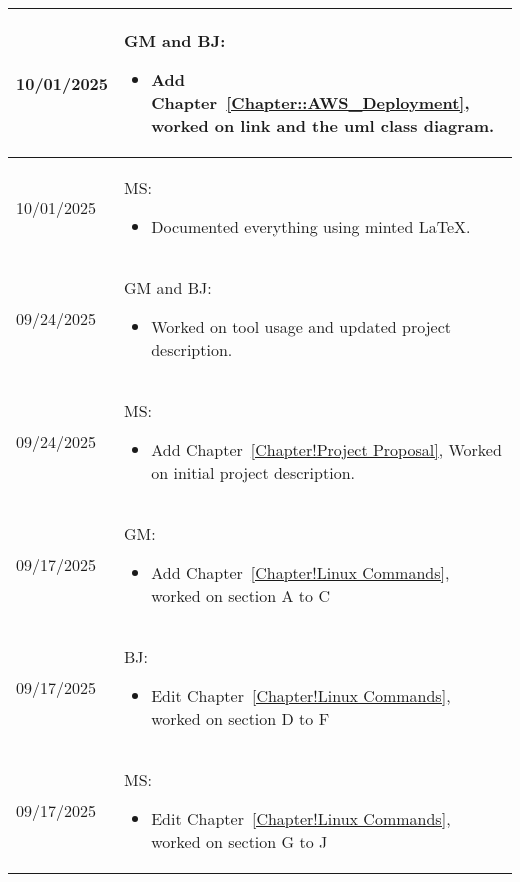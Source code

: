 \begin{longtable}{|l||p{13.5cm}|}
10/01/2025 & GM and BJ:
\begin{itemize}[topsep=0pt,itemsep=0pt,parsep=0pt,partopsep=0pt,leftmargin=12pt]
\item Add Chapter~\ref{Chapter::AWS_Deployment}, worked on link and the uml class diagram. 
\end{itemize} 
\\ \hline

10/01/2025 & MS:
\begin{itemize}[topsep=0pt,itemsep=0pt,parsep=0pt,partopsep=0pt,leftmargin=12pt]
\item Documented everything using minted LaTeX.
\end{itemize} 
\\ \hline

09/24/2025 & GM and BJ:
\begin{itemize}[topsep=0pt,itemsep=0pt,parsep=0pt,partopsep=0pt,leftmargin=12pt]
\item Worked on tool usage and updated project description.
\end{itemize} 
\\ \hline

09/24/2025 & MS:
\begin{itemize}[topsep=0pt,itemsep=0pt,parsep=0pt,partopsep=0pt,leftmargin=12pt]
\item Add  
Chapter~\ref{Chapter!Project Proposal}, Worked on initial project description.
\end{itemize} 
\\ \hline

09/17/2025 & GM:
\begin{itemize}[topsep=0pt,itemsep=0pt,parsep=0pt,partopsep=0pt,leftmargin=12pt]
\item Add  
Chapter~\ref{Chapter!Linux Commands}, worked on section A to C
\end{itemize} 
\\ \hline

09/17/2025 & BJ:
\begin{itemize}[topsep=0pt,itemsep=0pt,parsep=0pt,partopsep=0pt,leftmargin=12pt]
\item Edit  
Chapter~\ref{Chapter!Linux Commands}, worked on section D to F
\end{itemize} 
\\ \hline

09/17/2025 & MS:
\begin{itemize}[topsep=0pt,itemsep=0pt,parsep=0pt,partopsep=0pt,leftmargin=12pt]
\item Edit  
Chapter~\ref{Chapter!Linux Commands}, worked on section G to J
\end{itemize} 
\\ \hline



\end{longtable}
